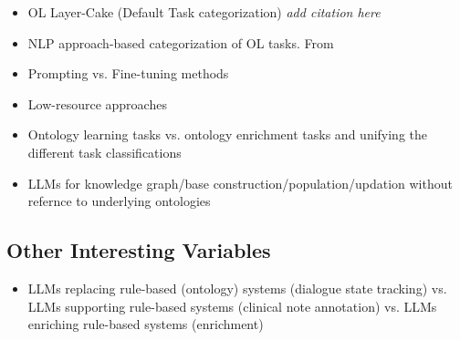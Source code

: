 \documentclass[a4paper,colorinlistoftodos]{article}
\begin{document}
\begin{itemize}
\item OL Layer-Cake (Default Task categorization) \textit{add citation here}
\item NLP approach-based categorization of OL tasks.
  From \cite{du2024ShortReviewOntology}
\item Prompting vs. Fine-tuning methods
\item Low-resource approaches
\item Ontology learning tasks vs. ontology enrichment tasks and unifying the
  different task classifications
\item LLMs for knowledge graph/base construction/population/updation without
  refernce to underlying ontologies
\end{itemize}

\subsection{Other Interesting Variables}
\label{subsec:other-variables}

\begin{itemize}
  \item LLMs replacing rule-based (ontology) systems (dialogue state tracking)
    vs. LLMs supporting rule-based systems (clinical note annotation) vs. LLMs
    enriching rule-based systems (enrichment)
  \end{itemize}





\end{document}
